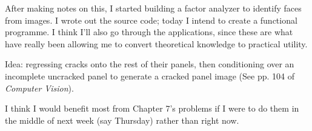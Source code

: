 \documentclass[idxtotoc,hyperref,openany]{labbook} %
\begin{document}
 After making notes on this, I started building a factor analyzer to identify faces from images. I wrote out the source code; today I intend to create a functional programme. I think I'll also go through the applications, since these are what have really been allowing me to convert theoretical knowledge to practical utility.
 
 Idea: regressing cracks onto the rest of their panels, then conditioning over an incomplete uncracked panel to generate a cracked panel image (See pp. 104 of \emph{Computer Vision}).
 
 I think I would benefit most from Chapter 7's problems if I were to do them in the middle of next week (say Thursday) rather than right now.
\end{document}
